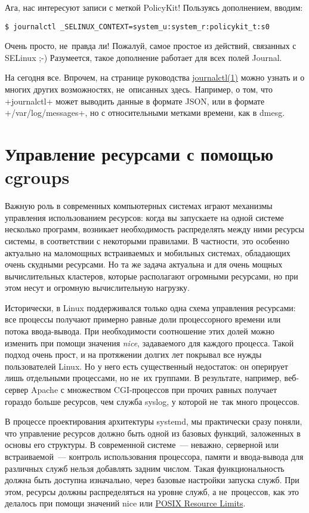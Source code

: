 \documentclass[10pt,oneside,a4paper]{article}
\begin{document}
Ага, нас интересуют записи с меткой PolicyKit! Пользуясь дополнением, вводим:
\begin{Verbatim}
$ journalctl _SELINUX_CONTEXT=system_u:system_r:policykit_t:s0	
\end{Verbatim}
Очень просто, не~правда ли! Пожалуй, самое простое из действий, связанных с
SELinux ;-) Разумеется, такое дополнение работает для всех полей Journal.

На сегодня все. Впрочем, на странице руководства
\href{http://www.freedesktop.org/software/systemd/man/journalctl.html}%
{journalctl(1)} можно узнать и о многих других возможностях, не~описанных здесь.
Например, о том, что +journalctl+ может выводить данные в формате JSON, или в
формате +/var/log/messages+, но с относительными метками времени, как в dmesg.

\section{Управление ресурсами с помощью cgroups}
\label{sec:resources}

Важную роль в современных компьютерных системах играют механизмы управления
использованием ресурсов: когда вы запускаете на одной системе несколько
программ, возникает необходимость распределять между ними ресурсы системы,
в соответствии с некоторыми правилами. В частности, это особенно актуально на
маломощных встраиваемых и мобильных системах, обладающих очень скудными
ресурсами. Но та же задача актуальна и для очень мощных вычислительных
кластеров, которые располагают огромными ресурсами, но при этом несут и огромную
вычислительную нагрузку.

Исторически, в Linux поддерживался только одна схема управления ресурсами: все
процессы получают примерно равные доли процессорного времени или потока
ввода-вывода. При необходимости соотношение этих долей можно изменить при
помощи значения \emph{nice}, задаваемого для каждого процесса. Такой подход
очень прост, и на протяжении долгих лет покрывал все нужды пользователей Linux.
Но у него есть существенный недостаток: он оперирует лишь отдельными процессами,
но не~их группами. В результате, например, веб-сервер Apache с множеством
CGI-процессов при прочих равных получает гораздо больше ресурсов, чем служба
syslog, у которой не~так много процессов.

В процессе проектирования архитектуры systemd, мы практически сразу поняли, что
управление ресурсов должно быть одной из базовых функций, заложенных в
основы его структуры. В современной системе~--- неважно, серверной или
встраиваемой~--- контроль использования процессора, памяти и ввода-вывода для
различных служб нельзя добавлять задним числом. Такая функциональность должна
быть доступна изначально, через базовые настройки запуска служб. При этом,
ресурсы должны распределяться на уровне служб, а не~процессов, как это делалось
при помощи значений nice или \href{http://linux.die.net/man/2/setrlimit}{POSIX
Resource Limits}.
\end{document}

